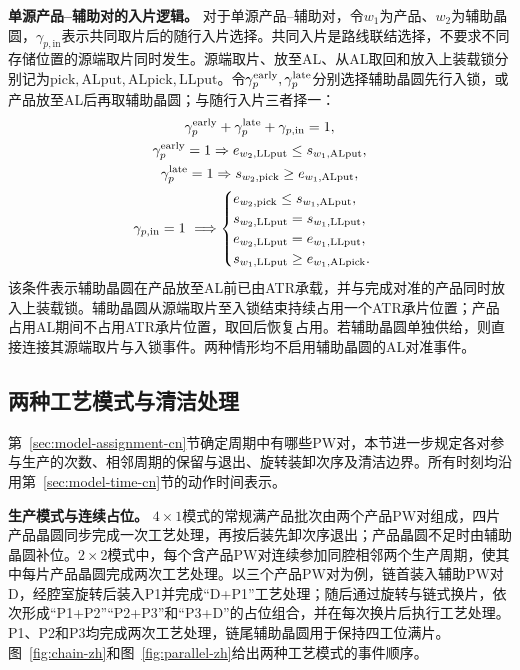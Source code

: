 \documentclass[final,5p,times,twocolumn]{elsarticle}
\begin{document}
\noindent\textbf{单源产品--辅助对的入片逻辑。}
对于单源产品--辅助对，令$w_1$为产品、$w_2$为辅助晶圆，$\gamma_{p,\mathrm{in}}$表示共同取片后的随行入片选择。共同入片是路线联结选择，不要求不同存储位置的源端取片同时发生。源端取片、放至AL、从AL取回和放入上装载锁分别记为$\mathrm{pick,ALput,ALpick,LLput}$。令$\gamma^{\rm early}_p,\gamma^{\rm late}_p$分别选择辅助晶圆先行入锁，或产品放至AL后再取辅助晶圆；与随行入片三者择一：
\begin{equation}
\begin{gathered}
\gamma^{\rm early}_p+\gamma^{\rm late}_p+\gamma_{p,\mathrm{in}}=1,\\
\gamma^{\rm early}_p=1\Rightarrow e_{w_2,\mathrm{LLput}}\le s_{w_1,\mathrm{ALput}},\\
\gamma^{\rm late}_p=1\Rightarrow s_{w_2,\mathrm{pick}}\ge e_{w_1,\mathrm{ALput}},\\
\gamma_{p,\mathrm{in}}=1\ \Longrightarrow
\begin{cases}
e_{w_2,\mathrm{pick}}\le s_{w_1,\mathrm{ALput}},\\
s_{w_2,\mathrm{LLput}}=s_{w_1,\mathrm{LLput}},\\
e_{w_2,\mathrm{LLput}}=e_{w_1,\mathrm{LLput}},\\
s_{w_1,\mathrm{LLput}}\ge e_{w_1,\mathrm{ALpick}}.
\end{cases}\end{gathered}
\label{eq:single-source-accompany-cn}
\end{equation}
该条件表示辅助晶圆在产品放至AL前已由ATR承载，并与完成对准的产品同时放入上装载锁。辅助晶圆从源端取片至入锁结束持续占用一个ATR承片位置；产品占用AL期间不占用ATR承片位置，取回后恢复占用。若辅助晶圆单独供给，则直接连接其源端取片与入锁事件。两种情形均不启用辅助晶圆的AL对准事件。

\subsection{两种工艺模式与清洁处理}
\label{sec:model-process-cn}

第~\ref{sec:model-assignment-cn}节确定周期中有哪些PW对，本节进一步规定各对参与生产的次数、相邻周期的保留与退出、旋转装卸次序及清洁边界。所有时刻均沿用第~\ref{sec:model-time-cn}节的动作时间表示。

\noindent\textbf{生产模式与连续占位。}
$4\times1$模式的常规满产品批次由两个产品PW对组成，四片产品晶圆同步完成一次工艺处理，再按后装先卸次序退出；产品晶圆不足时由辅助晶圆补位。$2\times2$模式中，每个含产品PW对连续参加同腔相邻两个生产周期，使其中每片产品晶圆完成两次工艺处理。以三个产品PW对为例，链首装入辅助PW对D，经腔室旋转后装入P1并完成“D+P1”工艺处理；随后通过旋转与链式换片，依次形成“P1+P2”“P2+P3”和“P3+D”的占位组合，并在每次换片后执行工艺处理。P1、P2和P3均完成两次工艺处理，链尾辅助晶圆用于保持四工位满片。图~\ref{fig:chain-zh}和图~\ref{fig:parallel-zh}给出两种工艺模式的事件顺序。
\end{document}
